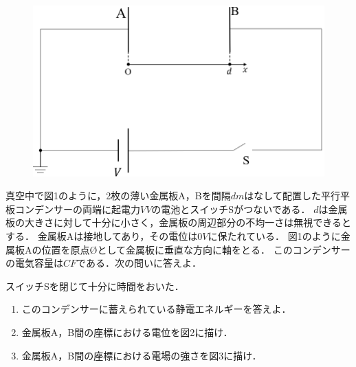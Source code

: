 \setcounter{figure}{0}
{%
\begin{figure}
  \vspace*{\baselineskip}
  \includegraphics[width=0.3\columnwidth]{../graphs/jumon_108_1.png}
  \caption{}
\end{figure}
真空中で図1のように，2枚の薄い金属板A，Bを間隔\mbox{$d\unit{m}$}はなして配置した平行平板コンデンサーの両端に起電力\mbox{$V\unit{V}$}の電池とスイッチSがつないである．
$d$は金属板の大きさに対して十分に小さく，金属板の周辺部分の不均一さは無視できるとする．
金属板Aは接地してあり，その電位は$0\unit{V}$に保たれている．
図1のように金属板Aの位置を原点\O として金属板に垂直な方向に\x 軸をとる．
このコンデンサーの電気容量は$C\unit{F}$である．次の問いに答えよ．
\par}

スイッチSを閉じて十分に時間をおいた．

\begin{enumerate}[（1）]
  \setlength{\leftskip}{-1.5zw}
  \setlength{\itemindent}{1zw}\setlength{\labelsep}{0.5zw}
  \setlength{\labelwidth}{1zw}\setlength{\leftmargin}{1zw}
  \setlength{\itemsep}{0.5\baselineskip}
  \item このコンデンサーに蓄えられている静電エネルギーを答えよ．
  \item 金属板A，B間の座標\x における電位を図2に描け．
  \item 金属板A，B間の座標\x における電場の強さを図3に描け．
\end{enumerate}

